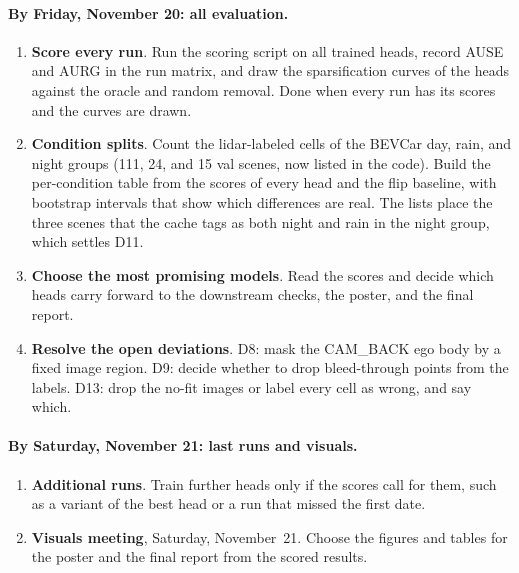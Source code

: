 \paragraph{By Friday, November 20: all evaluation.}
\begin{enumerate}[leftmargin=*, itemsep=2pt, topsep=2pt, resume]
  \item \textbf{Score every run}. Run the scoring script on all trained heads, record AUSE and AURG in the run matrix, and draw the sparsification curves of the heads against the oracle and random removal. Done when every run has its scores and the curves are drawn.
  \item \textbf{Condition splits}. Count the lidar-labeled cells of the BEVCar day, rain, and night groups (111, 24, and 15 val scenes, now listed in the code). Build the per-condition table from the scores of every head and the flip baseline, with bootstrap intervals that show which differences are real. The lists place the three scenes that the cache tags as both night and rain in the night group, which settles D11.
  \item \textbf{Choose the most promising models}. Read the scores and decide which heads carry forward to the downstream checks, the poster, and the final report.
  \item \textbf{Resolve the open deviations}. D8: mask the CAM\_BACK ego body by a fixed image region. D9: decide whether to drop bleed-through points from the labels. D13: drop the no-fit images or label every cell as wrong, and say which.
\end{enumerate}

\paragraph{By Saturday, November 21: last runs and visuals.}
\begin{enumerate}[leftmargin=*, itemsep=2pt, topsep=2pt, resume]
  \item \textbf{Additional runs}. Train further heads only if the scores call for them, such as a variant of the best head or a run that missed the first date.
  \item \textbf{Visuals meeting}, Saturday, November~21. Choose the figures and tables for the poster and the final report from the scored results.
\end{enumerate}

